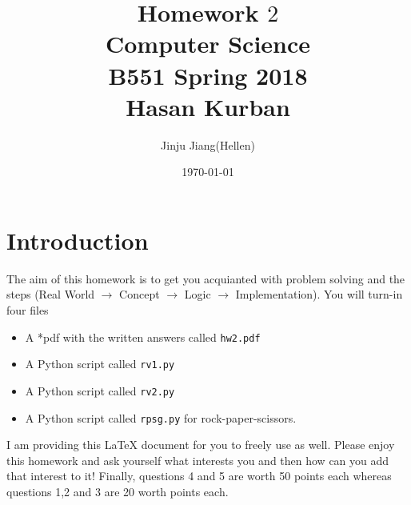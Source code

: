 \documentclass{article}
\begin{document}
\title{Homework $2$\\ Computer Science \\ B551 Spring 2018\\ Hasan Kurban}         %
\author{Jinju Jiang(Hellen)}        %
\date{\today}          %
\maketitle


\makeatother     %




\pagestyle{plain}
\section*{Introduction}
The aim of this homework is to get you acquianted with problem solving and the steps  (Real World $\rightarrow$ Concept $\rightarrow$ Logic  $\rightarrow$ Implementation).  You will turn-in four files\begin{itemize} \item A *pdf with the written answers called \texttt{hw2.pdf} \item A Python script called \texttt{rv1.py} \item  A Python script called  \texttt{rv2.py} \item A Python script called \texttt{rpsg.py}  for rock-paper-scissors.\end{itemize}  I am providing this \LaTeX{} document for you to freely use as well. Please enjoy this homework and ask yourself what interests you and then how can you add that interest to it!  Finally, questions 4 and 5 are
worth 50 points each whereas questions 1,2 and 3 are 20 worth points each.

\newpage
\end{document}
